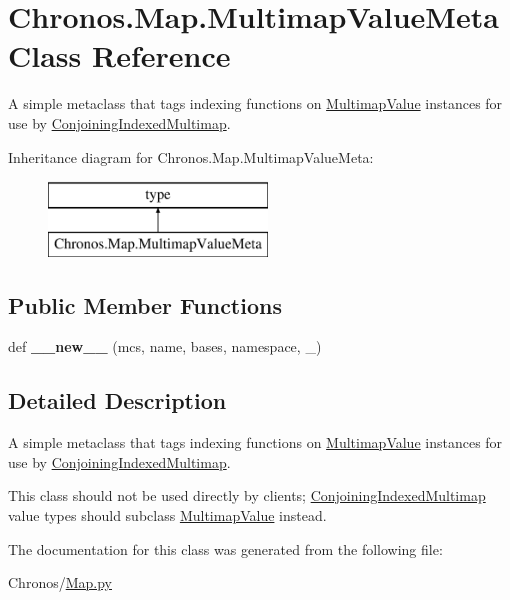 \hypertarget{classChronos_1_1Map_1_1MultimapValueMeta}{}\section{Chronos.\+Map.\+Multimap\+Value\+Meta Class Reference}
\label{classChronos_1_1Map_1_1MultimapValueMeta}


A simple metaclass that tags indexing functions on \hyperlink{classChronos_1_1Map_1_1MultimapValue}{Multimap\+Value} instances for use by \hyperlink{classChronos_1_1Map_1_1ConjoiningIndexedMultimap}{Conjoining\+Indexed\+Multimap}.  


Inheritance diagram for Chronos.\+Map.\+Multimap\+Value\+Meta\+:\begin{figure}[H]
\begin{center}
\leavevmode
\includegraphics[height=2.000000cm]{classChronos_1_1Map_1_1MultimapValueMeta}
\end{center}
\end{figure}
\subsection*{Public Member Functions}
\begin{DoxyCompactItemize}
\item 
def {\bfseries \+\_\+\+\_\+new\+\_\+\+\_\+} (mcs, name, bases, namespace, \+\_\+)
\end{DoxyCompactItemize}


\subsection{Detailed Description}
A simple metaclass that tags indexing functions on \hyperlink{classChronos_1_1Map_1_1MultimapValue}{Multimap\+Value} instances for use by \hyperlink{classChronos_1_1Map_1_1ConjoiningIndexedMultimap}{Conjoining\+Indexed\+Multimap}. 

This class should not be used directly by clients; \hyperlink{classChronos_1_1Map_1_1ConjoiningIndexedMultimap}{Conjoining\+Indexed\+Multimap} value types should subclass \hyperlink{classChronos_1_1Map_1_1MultimapValue}{Multimap\+Value} instead. 

The documentation for this class was generated from the following file\+:\begin{DoxyCompactItemize}
\item 
Chronos/\hyperlink{Map_8py}{Map.\+py}\end{DoxyCompactItemize}
